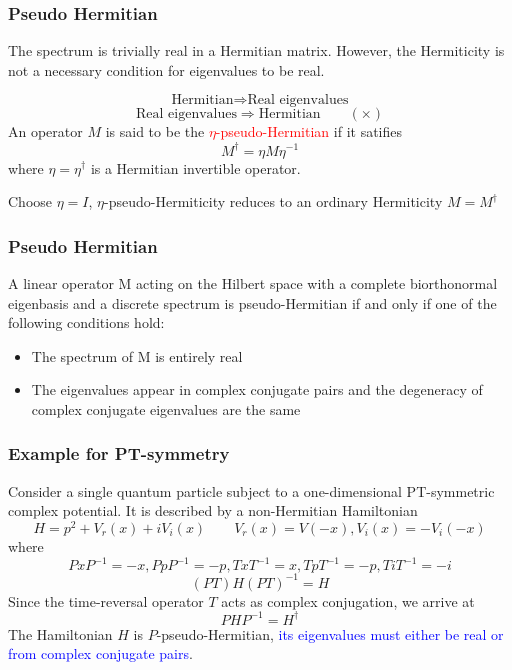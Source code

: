 \documentclass{beamer}
\begin{document}
\begin{frame}
\frametitle{Pseudo Hermitian}
\begin{block}{}
The spectrum is trivially real in a Hermitian matrix. However, the Hermiticity is not a necessary condition for eigenvalues to be real.
\end{block}
$$\textrm{Hermitian}\Rightarrow	\textrm{Real eigenvalues}$$
$$\textrm{Real eigenvalues}\Rightarrow	\textrm{Hermitian}\qquad(\times)$$
An operator $M$ is said to be the \textcolor{red}{$\eta$-pseudo-Hermitian} if it satifies
\begin{equation}
M^\dagger=\eta M\eta^{-1}
\end{equation}
where $\eta=\eta^\dagger$ is a Hermitian invertible operator.
\begin{block}{}
Choose $\eta=I$, $\eta$-pseudo-Hermiticity reduces to an ordinary Hermiticity $M=M^\dagger$
\end{block}
\end{frame}
\begin{frame}
\frametitle{Pseudo Hermitian}
\begin{theorem}
A linear operator M acting on the Hilbert space with a
complete biorthonormal eigenbasis and a discrete spectrum is pseudo-Hermitian if and only if
one of the following conditions hold:
\begin{itemize}
	\item The spectrum of M is entirely real
	\item The eigenvalues appear in complex conjugate pairs and the degeneracy of complex conjugate eigenvalues are the same
\end{itemize}
\end{theorem}
\end{frame}
\begin{frame}
\frametitle{Example for PT-symmetry}
Consider a single quantum particle subject to a one-dimensional PT-symmetric complex potential. It is described by a non-Hermitian Hamiltonian
\begin{equation}
H=p^2+V_r(x)+iV_i(x)\qquad V_r(x)=V(-x),V_i(x)=-V_i(-x)
\end{equation}
where
$$PxP^{-1}=-x,PpP^{-1}=-p,TxT^{-1}=x,TpT^{-1}=-p,TiT^{-1}=-i$$
$$(PT)H(PT)^{-1}=H$$
Since the time-reversal operator $T$ acts as complex conjugation, we arrive at
\begin{equation}
PHP^{-1}=H^\dagger
\end{equation}
The Hamiltonian $H$ is $P$-pseudo-Hermitian,\textcolor{blue}{ its eigenvalues must either be real or from complex conjugate pairs}.
\end{frame}
\end{document}
